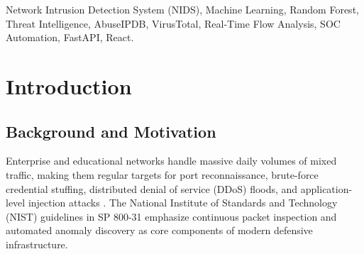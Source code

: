 \documentclass[conference]{IEEEtran}
\begin{document}
\begin{abstract}
Defending modern campus and enterprise computer networks against intrusions requires analyzing high-velocity traffic under strict latency constraints. Conventional signature-based tools like Snort and Suricata struggle against zero-day exploits and polymorphic payloads, while standalone machine learning classifiers often trigger high false alarm rates without actionable context. In this work, we build and test \textbf{SecureNet IDS}, a practical hybrid network intrusion detection framework that couples statistical flow classification with real-time threat intelligence lookups and automated containment. Our pipeline sniffs incoming frames on commodity interfaces, groups packets into bidirectional 5-tuple flows, extracts 24 temporal and volumetric metrics, and evaluates them using a tuned Random Forest ensemble. Detections flagged as suspicious trigger asynchronous reputation queries to AbuseIPDB and VirusTotal, deriving a weighted Composite Risk Score ($\mathcal{R} \in [0, 100]$). Evaluated across 148,517 network flows from NSL-KDD, CICIDS2017, and live campus test streams, SecureNet IDS reaches an accuracy of \textbf{99.42\%}, a macro F1-score of \textbf{0.993}, and a low false-positive rate of \textbf{0.28\%}, completing end-to-end processing in \textbf{11.90 ms} per flow. A companion web dashboard implemented in FastAPI and React provides real-time WebSocket telemetry, multi-analyst access control via 6-letter join keys, and auditable incident containment logs.
\end{abstract}

\begin{IEEEkeywords}
Network Intrusion Detection System (NIDS), Machine Learning, Random Forest, Threat Intelligence, AbuseIPDB, VirusTotal, Real-Time Flow Analysis, SOC Automation, FastAPI, React.
\end{IEEEkeywords}

\section{Introduction}

\subsection{Background and Motivation}
Enterprise and educational networks handle massive daily volumes of mixed traffic, making them regular targets for port reconnaissance, brute-force credential stuffing, distributed denial of service (DDoS) floods, and application-level injection attacks \cite{stallings2017}. The National Institute of Standards and Technology (NIST) guidelines in SP 800-31 \cite{nistsp80031} emphasize continuous packet inspection and automated anomaly discovery as core components of modern defensive infrastructure.
\end{document}
